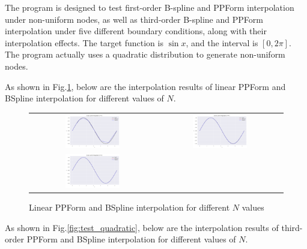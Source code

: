 \documentclass[a4paper]{article}
\begin{document}
\begin{sloppypar}
The program is designed to test first-order B-spline and PPForm interpolation under non-uniform nodes, as well as third-order B-spline and PPForm interpolation under five different boundary conditions, along with their interpolation effects. The target function is $\sin x$, and the interval is $[0,2\pi]$. The program actually uses a quadratic distribution to generate non-uniform nodes.

As shown in Fig.\ref{fig:test_linear}, below are the interpolation results of linear PPForm and BSpline interpolation for different values of \(N\).

\begin{figure}[H]
  \centering
  \begin{tabular}{cc}
    \includegraphics[width=0.45\textwidth]{../figure/test/linear_N11.png} &
    \includegraphics[width=0.45\textwidth]{../figure/test/linear_N41.png}   \\
    \includegraphics[width=0.45\textwidth]{../figure/test/linear_N91.png} &
  \end{tabular}
  \renewcommand{\figurename}{Fig.}
  \caption{Linear PPForm and BSpline interpolation for different \(N\) values}
  \label{fig:test_linear}
\end{figure}

As shown in Fig.\ref{fig:test_quadratic}, below are the interpolation results of third-order PPForm and BSpline interpolation for different values of \(N\).


\end{sloppypar}
\end{document}
